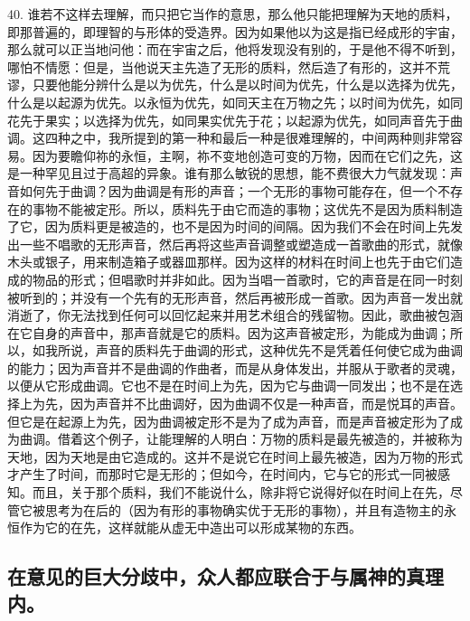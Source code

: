 40. 谁若不这样去理解，而只把它当作的意思，那么他只能把理解为天地的质料，即那普遍的，即理智的与形体的受造界。因为如果他以为这是指已经成形的宇宙，那么就可以正当地问他：而在宇宙之后，他将发现没有别的，于是他不得不听到，哪怕不情愿：但是，当他说天主先造了无形的质料，然后造了有形的，这并不荒谬，只要他能分辨什么是以为优先，什么是以时间为优先，什么是以选择为优先，什么是以起源为优先。以永恒为优先，如同天主在万物之先；以时间为优先，如同花先于果实；以选择为优先，如同果实优先于花；以起源为优先，如同声音先于曲调。这四种之中，我所提到的第一种和最后一种是很难理解的，中间两种则非常容易。因为要瞻仰祢的永恒，主啊，祢不变地创造可变的万物，因而在它们之先，这是一种罕见且过于高超的异象。谁有那么敏锐的思想，能不费很大力气就发现：声音如何先于曲调？因为曲调是有形的声音；一个无形的事物可能存在，但一个不存在的事物不能被定形。所以，质料先于由它而造的事物；这优先不是因为质料制造了它，因为质料更是被造的，也不是因为时间的间隔。因为我们不会在时间上先发出一些不唱歌的无形声音，然后再将这些声音调整或塑造成一首歌曲的形式，就像木头或银子，用来制造箱子或器皿那样。因为这样的材料在时间上也先于由它们造成的物品的形式；但唱歌时并非如此。因为当唱一首歌时，它的声音是在同一时刻被听到的；并没有一个先有的无形声音，然后再被形成一首歌。因为声音一发出就消逝了，你无法找到任何可以回忆起来并用艺术组合的残留物。因此，歌曲被包涵在它自身的声音中，那声音就是它的质料。因为这声音被定形，为能成为曲调；所以，如我所说，声音的质料先于曲调的形式，这种优先不是凭着任何使它成为曲调的能力；因为声音并不是曲调的作曲者，而是从身体发出，并服从于歌者的灵魂，以便从它形成曲调。它也不是在时间上为先，因为它与曲调一同发出；也不是在选择上为先，因为声音并不比曲调好，因为曲调不仅是一种声音，而是悦耳的声音。但它是在起源上为先，因为曲调被定形不是为了成为声音，而是声音被定形为了成为曲调。借着这个例子，让能理解的人明白：万物的质料是最先被造的，并被称为天地，因为天地是由它造成的。这并不是说它在时间上最先被造，因为万物的形式才产生了时间，而那时它是无形的；但如今，在时间内，它与它的形式一同被感知。而且，关于那个质料，我们不能说什么，除非将它说得好似在时间上在先，尽管它被思考为在后的（因为有形的事物确实优于无形的事物），并且有造物主的永恒作为它的在先，这样就能从虚无中造出可以形成某物的东西。\par


\subsection{在意见的巨大分歧中，众人都应联合于与属神的真理内。}

